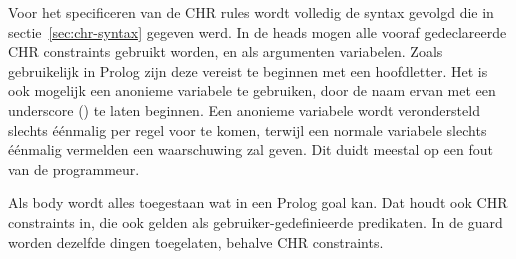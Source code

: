 Voor het specificeren van de CHR rules wordt volledig de syntax gevolgd die in sectie~\ref{sec:chr-syntax} gegeven werd. In de heads mogen alle vooraf gedeclareerde CHR constraints gebruikt worden, en als argumenten variabelen. Zoals gebruikelijk in Prolog zijn deze vereist te beginnen met een hoofdletter. Het is ook mogelijk een anonieme variabele te gebruiken, door de naam ervan met een underscore (\code{\_}) te laten beginnen. Een anonieme variabele wordt verondersteld slechts \'e\'enmalig per regel voor te komen, terwijl een normale variabele slechts \'e\'enmalig vermelden een waarschuwing zal geven. Dit duidt meestal op een fout van de programmeur.

Als body wordt alles toegestaan wat in een Prolog goal kan. Dat houdt ook CHR constraints in, die ook gelden als gebruiker-gedefinieerde predikaten. In de guard worden dezelfde dingen toegelaten, behalve CHR constraints.

